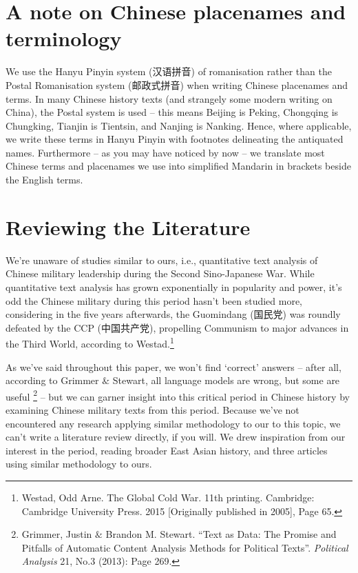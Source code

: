 \documentclass[12pt,letterpaper]{article}
\begin{document}
\begin{CJK*}{UTF8}{gbsn}
		\vspace{0.5cm}
		
		\maketitle
		\section*{A note on Chinese placenames and terminology}
		\vspace{.1cm}
		We use the Hanyu Pinyin system (汉语拼音) of romanisation rather than the Postal Romanisation system (邮政式拼音) when writing Chinese placenames and terms. In many Chinese history texts (and strangely some modern writing on China), the Postal system is used – this means Beijing is Peking, Chongqing is Chungking, Tianjin is Tientsin, and Nanjing is Nanking. Hence, where applicable, we write these terms in Hanyu Pinyin with footnotes delineating the antiquated names. Furthermore – as you may have noticed by now – we translate most Chinese terms and placenames we use into simplified Mandarin in brackets beside the English terms.
		\vspace{.5cm}
		\maketitle
		\section*{Reviewing the Literature}
		\vspace{.1cm}
		We’re unaware of studies similar to ours, i.e., quantitative text analysis of Chinese military leadership during the Second Sino-Japanese War. While quantitative text analysis has grown exponentially in popularity and power, it’s odd the Chinese military during this period hasn’t been studied more, considering in the five years afterwards, the Guomindang (国民党) was roundly defeated by the CCP (中国共产党), propelling Communism to major advances in the Third World, according to Westad.\footnote{Westad, Odd Arne. The Global Cold War. 11th printing. Cambridge: Cambridge University Press. 2015 [Originally published in 2005], Page 65.} 
		
		\vspace{.35cm}
		
		\noindent As we’ve said throughout this paper, we won’t find ‘correct’ answers – after all, according to Grimmer $\&$ Stewart, all language models are wrong, but some are useful \footnote{Grimmer, Justin $\&$ Brandon M. Stewart. “Text as Data: The Promise and Pitfalls of Automatic Content Analysis Methods for Political Texts”. \textit{Political Analysis} 21, No.3 (2013): Page 269.} – but we can garner insight into this critical period in Chinese history by examining Chinese military texts from this period. Because we’ve not encountered any research applying similar methodology to our to this topic, we can’t write a literature review directly, if you will. We drew inspiration from our interest in the period, reading broader East Asian history, and three articles using similar methodology to ours.
		

\end{CJK*}
\end{document}
